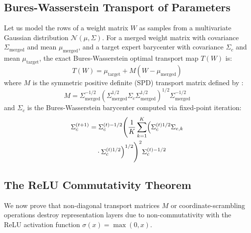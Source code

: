 \documentclass{article}
\theoremstyle{plain}
\theoremstyle{definition}
\theoremstyle{remark}
\begin{document}
\subsection{Bures-Wasserstein Transport of Parameters}
Let us model the rows of a weight matrix $W$ as samples from a multivariate Gaussian distribution $\mathcal{N}(\mu, \Sigma)$. For a merged weight matrix with covariance $\Sigma_{\text{merged}}$ and mean $\mu_{\text{merged}}$, and a target expert barycenter with covariance $\Sigma_{c}$ and mean $\mu_{\text{target}}$, the exact Bures-Wasserstein optimal transport map $T(W)$ is:
\begin{equation}
  T(W) = \mu_{\text{target}} + M (W - \mu_{\text{merged}})
\end{equation}
where $M$ is the symmetric positive definite (SPD) transport matrix defined by \cite{bures_wasserstein}:
\begin{equation}
  M = \Sigma_{\text{merged}}^{-1/2} \left( \Sigma_{\text{merged}}^{1/2} \Sigma_c \Sigma_{\text{merged}}^{1/2} \right)^{1/2} \Sigma_{\text{merged}}^{-1/2}
\end{equation}
and $\Sigma_c$ is the Bures-Wasserstein barycenter computed via fixed-point iteration:
\begin{equation}
\begin{split}
  \Sigma_c^{(t+1)} &= \Sigma_c^{(t)-1/2} \Biggl( \frac{1}{K} \sum_{k=1}^K \Bigl( \Sigma_c^{(t)1/2} \Sigma_{e, k} \\
  &\quad \cdot \Sigma_c^{(t)1/2} \Bigr)^{1/2} \Biggr)^2 \Sigma_c^{(t)-1/2}
\end{split}
\end{equation}

\subsection{The ReLU Commutativity Theorem}
We now prove that non-diagonal transport matrices $M$ or coordinate-scrambling operations destroy representation layers due to non-commutativity with the ReLU activation function $\sigma(x) = \max(0, x)$.
\end{document}
